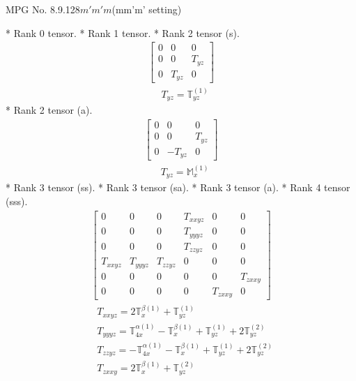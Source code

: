 \documentclass[fleqn,8pt,landscape]{jsarticle}
\begin{document}
\setcounter{MaxMatrixCols}{32}

\renewcommand{\tablename}{Table~}
\renewcommand{\figurename}{Figure~}
\begin{center}
\LARGE
MPG No. 8.9.128\quad$m'm'm$\quad(mm'm' setting)
\end{center}
* Rank 0 tensor.
* Rank 1 tensor.
* Rank 2 tensor (s).
\begin{align*}
\begin{bmatrix} 0 & 0 & 0 \\ 0 & 0 & T_{yz} \\ 0 & T_{yz} & 0 \end{bmatrix}
\end{align*}
\begin{align*}
& T_{yz} = \mathbb{T}_{yz}^{(1)}
\end{align*}
* Rank 2 tensor (a).
\begin{align*}
\begin{bmatrix} 0 & 0 & 0 \\ 0 & 0 & T_{yz} \\ 0 & - T_{yz} & 0 \end{bmatrix}
\end{align*}
\begin{align*}
& T_{yz} = \mathbb{M}_{x}^{(1)}
\end{align*}
* Rank 3 tensor (ss).
* Rank 3 tensor (sa).
* Rank 3 tensor (a).
* Rank 4 tensor (sss).
\begin{align*}
\begin{bmatrix} 0 & 0 & 0 & T_{xxyz} & 0 & 0 \\ 0 & 0 & 0 & T_{yyyz} & 0 & 0 \\ 0 & 0 & 0 & T_{zzyz} & 0 & 0 \\ T_{xxyz} & T_{yyyz} & T_{zzyz} & 0 & 0 & 0 \\ 0 & 0 & 0 & 0 & 0 & T_{zxxy} \\ 0 & 0 & 0 & 0 & T_{zxxy} & 0 \end{bmatrix}
\end{align*}
\begin{align*}
& T_{xxyz} = 2 \mathbb{T}_{x}^{\beta(1)} + \mathbb{T}_{yz}^{(1)} \\
& T_{yyyz} = \mathbb{T}_{4x}^{\alpha(1)} - \mathbb{T}_{x}^{\beta(1)} + \mathbb{T}_{yz}^{(1)} + 2 \mathbb{T}_{yz}^{(2)} \\
& T_{zzyz} = - \mathbb{T}_{4x}^{\alpha(1)} - \mathbb{T}_{x}^{\beta(1)} + \mathbb{T}_{yz}^{(1)} + 2 \mathbb{T}_{yz}^{(2)} \\
& T_{zxxy} = 2 \mathbb{T}_{x}^{\beta(1)} + \mathbb{T}_{yz}^{(2)}
\end{align*}
\end{document}
